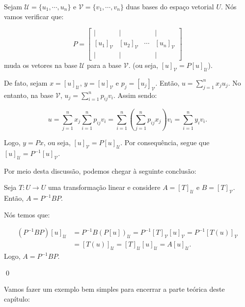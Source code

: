 Sejam $\mathcal{U} = \{u_1, \cdots, u_n\}$ e $\mathcal{V} = \{v_1, \cdots, v_n\}$ duas bases do espaço vetorial $U$. Nós vamos verificar que:

$$
P = \begin{bmatrix}
	| & | & & | \\
	[u_1]_\mathcal{V} & [u_2]_\mathcal{V} & \cdots & [u_n]_\mathcal{V} \\
	| & | & & |
\end{bmatrix}
$$
muda os vetores na base $\mathcal{U}$ para a base $\mathcal{V}$. (ou seja, $[u]_\mathcal{V} = P[u]_\mathcal{U}$).

De fato, sejam $x = [u]_\mathcal{U}$, $y = [u]_\mathcal{V}$ e $p_j = [u_j]_\mathcal{V}$. Então, $u = \sum\limits_{j = 1}^{n} x_ju_j$. No entanto, na base $\mathcal{V}$, $u_j = \sum\limits_{i = 1}^{n} p_{ij}v_i$. Assim sendo:

$$
u = \sum\limits_{j = 1}^{n} x_j\sum\limits_{i = 1}^{n} p_{ij}v_i = \sum\limits_{i = 1}^{n}\left(\sum\limits_{j = 1}^{n}p_{ij}x_j\right)v_i = \sum\limits_{i = 1}^{n} y_iv_i.
$$

Logo, $y = Px$, ou seja, $[u]_\mathcal{V} = P[u]_\mathcal{U}$. Por consequência, segue que $[u]_\mathcal{U} = P^{-1}[u]_\mathcal{V}$.

Por meio desta discussão, podemos chegar à seguinte conclusão:

\begin{Theorem}
	Seja $T:U\to U$ uma transformação linear e considere $A = [T]_\mathcal{U}$ e $B = [T]_\mathcal{V}$. Então, $A = P^{-1}BP$.
\end{Theorem}

\begin{Proof}
	Nós temos que:
	
	\begin{align*}
		(P^{-1}BP)[u]_\mathcal{U} &= P^{-1}B(P[u])_\mathcal{U} = P^{-1}[T]_\mathcal{V}[u]_\mathcal{V} = P^{-1}[T(u)]_\mathcal{V}\\ &= [T(u)]_\mathcal{U} = [T]_\mathcal{U}[u]_\mathcal{U} = A[u]_\mathcal{U}.
	\end{align*} 
	Logo, $A = P^{-1}BP$.
	
	\qed
\end{Proof}

Vamos fazer um exemplo bem simples para encerrar a parte teórica deste capítulo:


